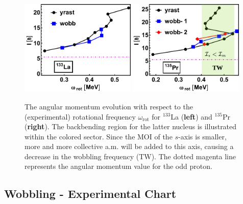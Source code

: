 \begin{figure}
    \begin{center}
        \includegraphics[width=0.49\textwidth]{Chapters/Figures/133La_wob-edited.pdf}
        \includegraphics[width=0.49\textwidth]{Chapters/Figures/135Pr_wob-edited.pdf}
        \caption{The angular momentum evolution with respect to the (experimental) rotational frequency $\omega_\text{rot}$ for $^{133}$La (\textbf{left}) and $^{135}$Pr (\textbf{right}). The backbending region for the latter nucleus is illustrated within the colored sector. Since the MOI of the $s$-axis is smaller, more and more collective a.m. will be added to this axis, causing a decrease in the wobbling frequency (TW). The dotted magenta line represents the angular momentum value for the odd proton.}
        \label{spin-vs-rotationalFreq-133-135}
    \end{center}
\end{figure}

\subsection{Wobbling - Experimental Chart}

